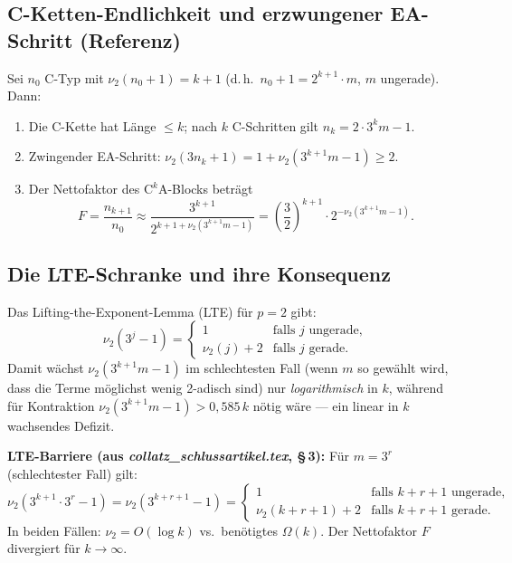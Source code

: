 \documentclass[12pt,a4paper]{article}
\newcommand{\vii}{\nu_2}
\begin{document}
\subsection{C-Ketten-Endlichkeit und erzwungener EA-Schritt (Referenz)}

\begin{tcolorbox}[ergebnis, title={Bewiesene Grundstruktur (Wiederholung)}]
Sei $n_0$ C-Typ mit $\vii(n_0+1) = k+1$ (d.\,h.\ $n_0+1 = 2^{k+1}\cdot m$,
$m$ ungerade). Dann:
\begin{enumerate}[label=(\arabic*)]
  \item Die C-Kette hat Länge $\leq k$; nach $k$ C-Schritten gilt
    $n_k = 2\cdot 3^k m - 1$.
  \item Zwingender EA-Schritt: $\vii(3n_k+1) = 1 + \vii(3^{k+1}m - 1) \geq 2$.
  \item Der Nettofaktor des $\mathrm{C}^k\mathrm{A}$-Blocks beträgt
    \[
      F = \frac{n_{k+1}}{n_0}
      \approx \frac{3^{k+1}}{2^{k+1+\vii(3^{k+1}m-1)}}
      = \left(\frac{3}{2}\right)^{k+1} \cdot 2^{-\vii(3^{k+1}m-1)}.
    \]
\end{enumerate}
\end{tcolorbox}

\subsection{Die LTE-Schranke und ihre Konsequenz}

Das Lifting-the-Exponent-Lemma (LTE) für $p=2$ gibt:
\[
  \vii(3^j - 1) =
  \begin{cases}
    1 & \text{falls $j$ ungerade,}\\
    \vii(j) + 2 & \text{falls $j$ gerade.}
  \end{cases}
\]
Damit wächst $\vii(3^{k+1}m-1)$ im schlechtesten Fall (wenn $m$ so
gewählt wird, dass die Terme möglichst wenig 2-adisch sind) nur
\emph{logarithmisch} in $k$, während für Kontraktion
$\vii(3^{k+1}m-1) > 0{,}585\,k$ nötig wäre --- ein linear in $k$
wachsendes Defizit.

\begin{tcolorbox}[lte]
\textbf{LTE-Barriere (aus \textit{collatz\_schlussartikel.tex}, §\,3):}
Für $m = 3^r$ (schlechtester Fall) gilt:
\[
  \vii(3^{k+1}\cdot 3^r - 1) = \vii(3^{k+r+1}-1) =
  \begin{cases}
    1 & \text{falls } k+r+1 \text{ ungerade,}\\
    \vii(k+r+1)+2 & \text{falls } k+r+1 \text{ gerade.}
  \end{cases}
\]
In beiden Fällen: $\vii = O(\log k)$ vs.\ benötigtes $\Omega(k)$.
Der Nettofaktor $F$ divergiert für $k\to\infty$.
\end{tcolorbox}
\end{document}
